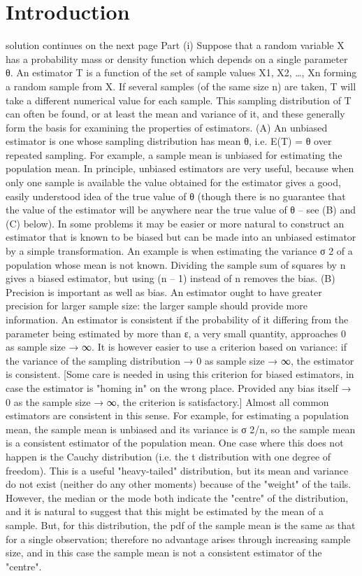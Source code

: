 \documentclass{article}
\author{kobriendublin }
\date{December 2018}
\begin{document}
\section{Introduction}
\begin{enumerate}[(i)]
\itemThis solution continues on the next page
Part (i)
Suppose that a random variable X has a probability mass or density function which depends on a single parameter θ. An estimator T is a function of the set of sample values X1, X2, …, Xn forming a random sample from X. If several samples (of the same size n) are taken, T will take a different numerical value for each sample. This sampling distribution of T can often be found, or at least the mean and variance of it, and these generally form the basis for examining the properties of estimators.
(A) An unbiased estimator is one whose sampling distribution has mean θ, i.e. E(T) = θ over repeated sampling. For example, a sample mean is unbiased for estimating the population mean. In principle, unbiased estimators are very useful, because when only one sample is available the value obtained for the estimator gives a good, easily understood idea of the true value of θ (though there is no guarantee that the value of the estimator will be anywhere near the true value of θ – see (B) and (C) below). In some problems it may be easier or more natural to construct an estimator that is known to be biased but can be made into an unbiased estimator by a simple transformation. An example is when estimating the variance σ 2 of a population whose mean is not known. Dividing the sample sum of squares by n gives a biased estimator, but using (n – 1) instead of n removes the bias.
(B) Precision is important as well as bias. An estimator ought to have greater precision for larger sample size: the larger sample should provide more information. An estimator is consistent if the probability of it differing from the parameter being estimated by more than ε, a very small quantity, approaches 0 as sample size → ∞. It is however easier to use a criterion based on variance: if the variance of the sampling distribution → 0 as sample size → ∞, the estimator is consistent. [Some care is needed in using this criterion for biased estimators, in case the estimator is "homing in" on the wrong place. Provided any bias itself → 0 as the sample size → ∞, the criterion is satisfactory.] Almost all common estimators are consistent in this sense. For example, for estimating a population mean, the sample mean is unbiased and its variance is σ 2/n, so the sample mean is a consistent estimator of the population mean. One case where this does not happen is the Cauchy distribution (i.e. the t distribution with one degree of freedom). This is a useful "heavy-tailed" distribution, but its mean and variance do not exist (neither do any other moments) because of the "weight" of the tails. However, the median or the mode both indicate the "centre" of the distribution, and it is natural to suggest that this might be estimated by the mean of a sample. But, for this distribution, the pdf of the sample mean is the same as that for a single observation; therefore no advantage arises through increasing sample size, and in this case the sample mean is not a consistent estimator of the "centre".

\end{enumerate}
\end{document}
